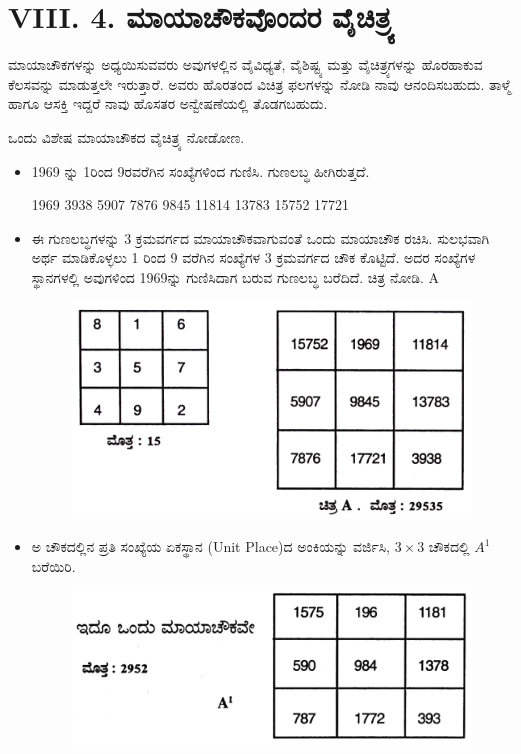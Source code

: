 \section*{VIII. 4. ಮಾಯಾಚೌಕವೊಂದರ ವೈಚಿತ್ರ್ಯ}

ಮಾಯಾಚೌಕಗಳನ್ನು ಅಧ್ಯಯಿಸುವವರು ಅವುಗಳಲ್ಲಿನ ವೈವಿಧ್ಯತೆ, ವೈಶಿಷ್ಟ್ಯ ಮತ್ತು ವೈಚಿತ್ರ್ಯಗಳನ್ನು ಹೊರಹಾಕುವ ಕೆಲಸವನ್ನು ಮಾಡುತ್ತಲೇ ಇರುತ್ತಾರೆ. ಅವರು ಹೊರತಂದ ವಿಚಿತ್ರ ಫಲಗಳನ್ನು ನೋಡಿ ನಾವು ಆನಂದಿಸಬಹುದು. ತಾಳ್ಮೆ ಹಾಗೂ ಆಸಕ್ತಿ ಇದ್ದರೆ ನಾವು ಹೊಸತರ ಅನ್ವೇಷಣೆಯಲ್ಲಿ ತೊಡಗಬಹುದು.

ಒಂದು ವಿಶೇಷ ಮಾಯಾಚೌಕದ ವೈಚಿತ್ರ್ಯ ನೋಡೋಣ.

\begin{itemize}
	\item 1969 ನ್ನು 1ರಿಂದ 9ರವರೆಗಿನ ಸಂಖ್ಯೆಗಳಿಂದ ಗುಣಿಸಿ. ಗುಣಲಬ್ಧ ಹೀಗಿರುತ್ತದೆ.

	1969 3938 5907 7876 9845 11814 13783 15752 17721
	\item ಈ ಗುಣಲಬ್ಧಗಳನ್ನು 3 ಕ್ರಮವರ್ಗದ ಮಾಯಾಚೌಕವಾಗುವಂತೆ ಒಂದು ಮಾಯಾಚೌಕ ರಚಿಸಿ. ಸುಲಭವಾಗಿ ಅರ್ಥ ಮಾಡಿಕೊಳ್ಳಲು 1 ರಿಂದ 9 ವರೆಗಿನ ಸಂಖ್ಯೆಗಳ 3 ಕ್ರಮವರ್ಗದ ಚೌಕ ಕೊಟ್ಟಿದೆ. ಅದರ ಸಂಖ್ಯೆಗಳ ಸ್ಥಾನಗಳಲ್ಲಿ ಅವುಗಳಿಂದ 1969ನ್ನು ಗುಣಿಸಿದಾಗ ಬರುವ ಗುಣಲಬ್ಧ ಬರೆದಿದೆ. ಚಿತ್ರ ನೋಡಿ. A
	\begin{figure}[H]
	\includegraphics{src/figures/chap7/fig7.8.jpg}
	\end{figure}

	\item ಅ ಚೌಕದಲ್ಲಿನ ಪ್ರತಿ ಸಂಖ್ಯೆಯ ಏಕಸ್ಥಾನ (Unit Place)ದ ಅಂಕಿಯನ್ನು ವರ್ಜಿಸಿ, $3 \times 3$ ಚೌಕದಲ್ಲಿ $A^1$ ಬರೆಯಿರಿ.
	\begin{figure}[H]
	\includegraphics{src/figures/chap7/fig7.9.jpg}
	\end{figure}
\end{itemize}


